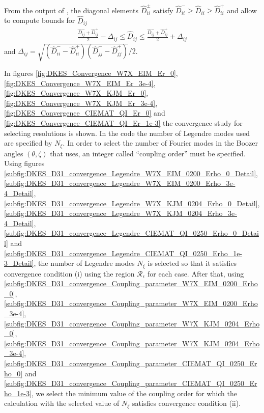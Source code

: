 From the output of {\DKES}, the diagonal elements $\widehat{D}_{ii}^{\pm}$ satisfy $\widehat{D}_{ii}^{-} \ge \widehat{D}_{ii} \ge\widehat{D}_{ii}^{+}$ and allow to compute bounds for $\widehat{D}_{ij}$
%
\begin{align}
	\frac{\widehat{D}_{ij}^{-} + \widehat{D}_{ij}^{+}}{2}
	-
	\Delta_{ij}
	\le
	\widehat{D}_{ij}
	\le
	\frac{\widehat{D}_{ij}^{-} + \widehat{D}_{ij}^{+}}{2}
	+
	\Delta_{ij}
\end{align}
and $\Delta_{ij} = \sqrt{(\widehat{D}_{ii}^{-} - \widehat{D}_{ii}^{+})(\widehat{D}_{jj}^{-} - \widehat{D}_{jj}^{+})} /2 $.  

In figures \ref{fig:DKES_Convergence_W7X_EIM_Er_0}, \ref{fig:DKES_Convergence_W7X_EIM_Er_3e-4}, \ref{fig:DKES_Convergence_W7X_KJM_Er_0}, \ref{fig:DKES_Convergence_W7X_KJM_Er_3e-4}, \ref{fig:DKES_Convergence_CIEMAT_QI_Er_0} and \ref{fig:DKES_Convergence_CIEMAT_QI_Er_1e-3} the convergence study for selecting {\DKES} resolutions is shown. In the code {\DKES} the number of Legendre modes used are specified by $N_\xi$. In order to select the number of Fourier modes in the Boozer angles $(\theta,\zeta)$ that {\DKES} uses, an integer called ``coupling order'' must be specified. Using figures \ref{subfig:DKES_D31_convergence_Legendre_W7X_EIM_0200_Erho_0_Detail}, \ref{subfig:DKES_D31_convergence_Legendre_W7X_EIM_0200_Erho_3e-4_Detail}, \ref{subfig:DKES_D31_convergence_Legendre_W7X_KJM_0204_Erho_0_Detail}, \ref{subfig:DKES_D31_convergence_Legendre_W7X_KJM_0204_Erho_3e-4_Detail}, \ref{subfig:DKES_D31_convergence_Legendre_CIEMAT_QI_0250_Erho_0_Detail} and \ref{subfig:DKES_D31_convergence_Legendre_CIEMAT_QI_0250_Erho_1e-3_Detail}, the number of Legendre modes $N_\xi$ is selected so that it satisfies convergence condition (i) using the region $\mathcal{R}_\epsilon$ for each case. After that, using \ref{subfig:DKES_D31_convergence_Coupling_parameter_W7X_EIM_0200_Erho_0}, \ref{subfig:DKES_D31_convergence_Coupling_parameter_W7X_EIM_0200_Erho_3e-4}, \ref{subfig:DKES_D31_convergence_Coupling_parameter_W7X_KJM_0204_Erho_0}, \ref{subfig:DKES_D31_convergence_Coupling_parameter_W7X_KJM_0204_Erho_3e-4}, \ref{subfig:DKES_D31_convergence_Coupling_parameter_CIEMAT_QI_0250_Erho_0} and \ref{subfig:DKES_D31_convergence_Coupling_parameter_CIEMAT_QI_0250_Erho_1e-3}, we select the minimum value of the coupling order for which the calculation with the selected value of $N_\xi$ satisfies convergence condition (ii).
 
 
%
%
%
%
%


